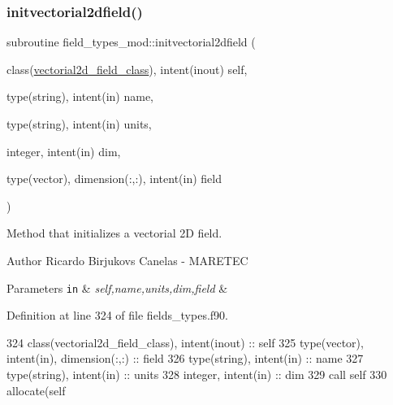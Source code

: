 \subsubsection{\texorpdfstring{initvectorial2dfield()}{initvectorial2dfield()}}
{\footnotesize\ttfamily subroutine field\+\_\+types\+\_\+mod\+::initvectorial2dfield (\begin{DoxyParamCaption}\item[{class(\mbox{\hyperlink{structfield__types__mod_1_1vectorial2d__field__class}{vectorial2d\+\_\+field\+\_\+class}}), intent(inout)}]{self,  }\item[{type(string), intent(in)}]{name,  }\item[{type(string), intent(in)}]{units,  }\item[{integer, intent(in)}]{dim,  }\item[{type(vector), dimension(\+:,\+:), intent(in)}]{field }\end{DoxyParamCaption})\hspace{0.3cm}{\ttfamily [private]}}



Method that initializes a vectorial 2D field. 

\begin{DoxyAuthor}{Author}
Ricardo Birjukovs Canelas -\/ M\+A\+R\+E\+T\+EC 
\end{DoxyAuthor}

\begin{DoxyParams}[1]{Parameters}
\mbox{\tt in}  & {\em self,name,units,dim,field} & \\
\hline
\end{DoxyParams}


Definition at line 324 of file fields\+\_\+types.\+f90.


\begin{DoxyCode}
324     \textcolor{keywordtype}{class}(vectorial2d\_field\_class), \textcolor{keywordtype}{intent(inout)} :: self
325     \textcolor{keywordtype}{type}(vector), \textcolor{keywordtype}{intent(in)}, \textcolor{keywordtype}{dimension(:,:)} :: field
326     \textcolor{keywordtype}{type}(string), \textcolor{keywordtype}{intent(in)} :: name
327     \textcolor{keywordtype}{type}(string), \textcolor{keywordtype}{intent(in)} :: units
328     \textcolor{keywordtype}{integer}, \textcolor{keywordtype}{intent(in)} :: dim
329     \textcolor{keyword}{call }self%
330     \textcolor{keyword}{allocate}(self%
\end{DoxyCode}
\mbox{\label{namespacefield__types__mod_a712c0d9941013a8f8c28e684a7c7f4c7}} 
